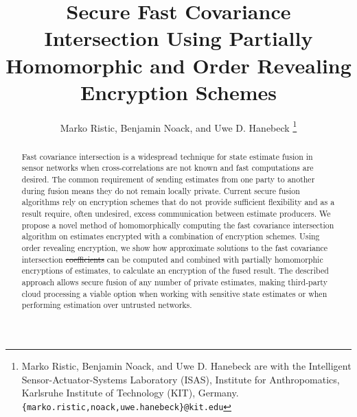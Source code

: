 \documentclass[letterpaper, 10 pt, conference]{ieeeconf}  %
\title{\LARGE \bf
Secure Fast Covariance Intersection Using Partially Homomorphic and Order Revealing Encryption Schemes
}
\author{Marko Ristic, Benjamin Noack, and Uwe D. Hanebeck%
\thanks{Marko Ristic, Benjamin Noack, and Uwe D. Hanebeck are with the Intelligent Sensor-Actuator-Systems Laboratory (ISAS), Institute for Anthropomatics, Karlsruhe Institute of Technology (KIT), Germany.\newline
{\tt\small \{marko.ristic,noack,uwe.hanebeck\}@kit.edu}%
}%
}
\providecommand{\DIFadd}[1]{{\protect\color{blue}\uwave{#1}}} %
\providecommand{\DIFdel}[1]{{\protect\color{red}\sout{#1}}}                      %
\providecommand{\DIFaddbegin}{} %
\providecommand{\DIFaddend}{} %
\providecommand{\DIFdelbegin}{} %
\providecommand{\DIFdelend}{} %
\begin{document}
\maketitle
\thispagestyle{empty}
\pagestyle{empty}




\begin{abstract}

Fast covariance intersection is a widespread technique for state estimate fusion in sensor networks when cross-correlations are not known and fast computations are desired. The common requirement of sending estimates from one party to another during fusion means they do not remain locally private. Current secure fusion algorithms rely on encryption schemes that do not provide sufficient flexibility and as a result require, often undesired, excess communication between estimate producers. We propose a novel method of homomorphically computing the fast covariance intersection algorithm on estimates encrypted with a combination of encryption schemes. Using order revealing encryption, we show how approximate solutions to the fast covariance intersection \DIFdelbegin \DIFdel{coefficients }\DIFdelend \DIFaddbegin \DIFadd{weights }\DIFaddend can be computed and combined with partially homomorphic encryptions of estimates, to calculate an encryption of the fused result. The described approach allows secure fusion of any number of private estimates, making third-party cloud processing a viable option when working with sensitive state estimates or when performing estimation over untrusted networks.

\end{abstract}



\end{document}
